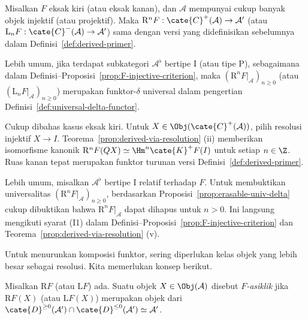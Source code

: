 \begin{proposisi}
	Misalkan $F$ eksak kiri (atau eksak kanan), dan $\mathcal{A}$ mempunyai cukup
	banyak objek injektif (atau projektif). Maka
	$\mathrm{R}^nF:\cate{C}^+(\mathcal{A})\to\mathcal{A}'$ (atau
	$\mathrm{L}_nF:\cate{C}^-(\mathcal{A})\to\mathcal{A}'$) sama dengan versi
yang didefinisikan sebelumnya dalam Definisi~\ref{def:derived-primer}.

	Lebih umum, jika terdapat subkategori $\mathcal{A}^\flat$ bertipe I (atau
	tipe P), sebagaimana dalam
	Definisi--Proposisi~\ref{prop:F-injective-criterion}, maka
	$(\mathrm{R}^nF|_{\mathcal{A}})_{n\geq0}$ (atau
	$(\mathrm{L}_nF|_{\mathcal{A}})_{n\geq0}$) merupakan funktor-$\delta$
	universal dalam pengertian Definisi~\ref{def:universal-delta-functor}.
\end{proposisi}
\begin{bukti}
	Cukup dibahas kasus eksak kiri. Untuk
	$X\in\Obj(\cate{C}^+(\mathcal{A}))$, pilih resolusi injektif $X\to I$.
	Teorema~\ref{prop:derived-via-resolution} (ii) memberikan isomorfisme
	kanonik
	$\mathrm{R}^nF(QX)\simeq\Hm^n\cate{K}^+F(I)$ untuk setiap $n\in\Z$.
	Ruas kanan tepat merupakan funktor turunan versi
	Definisi~\ref{def:derived-primer}.

	Lebih umum, misalkan $\mathcal{A}^\flat$ bertipe I relatif terhadap $F$.
	Untuk membuktikan universalitas
	$(\mathrm{R}^nF|_{\mathcal{A}})_{n\geq0}$, berdasarkan
	Proposisi~\ref{prop:erasable-univ-delta} cukup dibuktikan bahwa
	$\mathrm{R}^nF|_{\mathcal{A}}$ dapat dihapus untuk $n>0$. Ini langsung
	mengikuti syarat (I1) dalam
	Definisi--Proposisi~\ref{prop:F-injective-criterion} dan
	Teorema~\ref{prop:derived-via-resolution} (v).
\end{bukti}

Untuk menurunkan komposisi funktor, sering diperlukan kelas objek yang lebih
besar sebagai resolusi. Kita memerlukan konsep berikut.

\begin{definisi}\label{def:F-acyclic-object}
	Misalkan $\mathrm{R}F$ (atau $\mathrm{L}F$) ada. Suatu objek
	$X\in\Obj(\mathcal{A})$ disebut \emph{$F$-asiklik} jika
	$\mathrm{R}F(X)$ (atau $\mathrm{L}F(X)$) merupakan objek dari
	$\cate{D}^{\geq0}(\mathcal{A}')\cap\cate{D}^{\leq0}(\mathcal{A}')
	\simeq\mathcal{A}'$.
\end{definisi}

